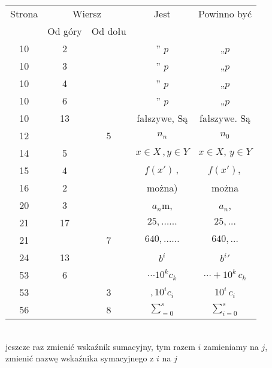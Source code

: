 \documentclass[a4paper,11pt]{article}
\begin{document}
\begin{center}

  \begin{tabular}{|c|c|c|c|c|}
    \hline
    Strona & \multicolumn{2}{c|}{Wiersz} & Jest
                              & Powinno być \\ \cline{2-3}
    & Od góry & Od dołu & & \\
    \hline
    10  &  2 & & ” $p$ & „$p$ \\
    10  &  3 & & ” $p$ & „$p$ \\
    10  &  4 & & ” $p$ & „$p$ \\
    10  &  6 & & ” $p$ & „$p$ \\
    10  & 13 & & fałszywe, Są & fałszywe. Są \\
    12  & &  5 & $n_{ n }$ & $n_{ 0 }$ \\
    14  &  5 & & $x \in X \, , y \in Y$ & $x \in X, \, y \in Y$ \\
    15  &  4 & & $f( x' ) \, ,$ & $f( x' ),$ \\
    16  &  2 & & można) & można \\
    20  &  3 & & $a_{ n }$m, & $a_{ n }$, \\
    21  & 17 & & $25, \ldots \ldots$ & $25, \ldots$ \\
    21  & &  7 & $640, \ldots \ldots$ & $640, \ldots$ \\
    24  & 13 & & $b^{ i }$ & $b^{ i }'$ \\
    53  &  6 & & $\cdots 10^{ k } c_{ k }$ & $\cdots + 10^{ k } \, c_{ k }$ \\
    53  & &  3 & $, 10^{ i } c_{ i }$ & $10^{ i } \, c_{ i }$ \\
    56  & &  8 & $\displaystyle \sum_{ = 0 }^{ s }$
      & $\displaystyle \sum_{ i = 0 }^{ s }$ \\
    \hline
  \end{tabular}

\end{center}

\vspace{\spaceTwo}

 \\
\Jest  jeszcze raz zmienić wskaźnik sumacyjny, tym razem $i$ zamieniamy na $j$, \\
\Powin zmienić nazwę wskaźnika symacyjnego z $i$ na $j$ \\













{}






\end{document}

